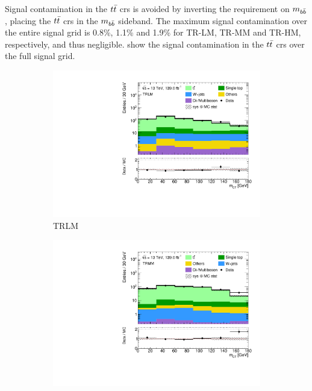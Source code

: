 Signal contamination in the $t\bar{t}$ \glspl{cr} is avoided by inverting the requirement on $m_{b\bar{b}}$, \ie placing the $t\bar{t}$ \glspl{cr} in the $m_{b\bar{b}}$ sideband. The maximum signal contamination over the entire signal grid is 0.8\%, 1.1\% and 1.9\% for TR-LM, TR-MM and TR-HM, respectively, and thus negligible.  show the signal contamination in the $t\bar{t}$ \glspl{cr} over the full signal grid. 

 \begin{figure}
	\centering
	\begin{subfigure}[b]{0.5\linewidth}
		\centering\includegraphics[width=1.0\textwidth]{1Lbb_TRLM_mct}
		\caption{TRLM\label{fig:signal_contamination_TRLM}}
	\end{subfigure}\hfill
	\begin{subfigure}[b]{0.5\linewidth}
		\centering\includegraphics[width=1.0\textwidth]{1Lbb_TRMM_mct}

\end{subfigure}
\end{figure}
